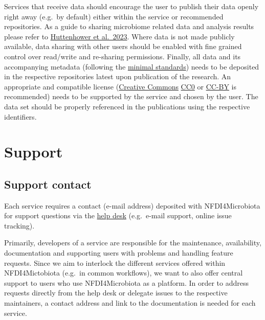 \documentclass[
  paper=a4,
  ,captions=tableheading
]{scrartcl}
\renewenvironment{quote}{\begin{shaded*}\begin{em}}{\end{em}\end{shaded*}}
\renewenvironment{quote}{\begin{customblockquote}\list{}{\rightmargin=0em\leftmargin=0em}%
\item\relax\color{blockquote-text}\ignorespaces}{\unskip\unskip\endlist\end{customblockquote}}
\begin{document}
\begin{quote}
Services that receive data should encourage the user to publish their
data openly right away (e.g.~by default) either within the service or
recommended repositories. As a guide to sharing microbiome related data
and analysis results please refer to
\href{https://doi.org/10.1038/s41564-023-01484-x}{Huttenhower et
al.~2023}. Where data is not made publicly available, data sharing with
other users should be enabled with fine grained control over read/write
and re-sharing permissions. Finally, all data and its accompanying
metadata (following the
\href{https://github.com/NFDI4Microbiota/MetadataStandards}{minimal
standards}) needs to be deposited in the respective repositories latest
upon publication of the research. An appropriate and compatible license
(\href{https://creativecommons.org/choose/\#}{Creative Commons}
\href{https://creativecommons.org/publicdomain/zero/1.0/}{CC0} or
\href{https://creativecommons.org/licenses/by/4.0/}{CC-BY} is
recommended) needs to be supported by the service and chosen by the
user. The data set should be properly referenced in the publications
using the respective identifiers.
\end{quote}

\hypertarget{support}{%
\section{Support}\label{support}}

\hypertarget{support-contact}{%
\subsection{Support contact}\label{support-contact}}

Each service requires a contact (e-mail address) deposited with
NFDI4Microbiota for support questions via the
\href{https://nfdi4microbiota.de/contact-form/}{help desk} (e.g.~e-mail
support, online issue tracking).

\begin{quote}
Primarily, developers of a service are responsible for the maintenance,
availability, documentation and supporting users with problems and
handling feature requests. Since we aim to interlock the different
services offered within NFDI4Mictobiota (e.g.~in common workflows), we
want to also offer central support to users who use NFDI4Microbiota as a
platform. In order to address requests directly from the help desk or
delegate issues to the respective maintainers, a contact address and
link to the documentation is needed for each service.
\end{quote}
\end{document}
